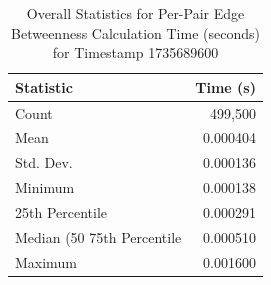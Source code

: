 \begin{table}[htbp]
\centering
\caption{Overall Statistics for Per-Pair Edge Betweenness Calculation Time (seconds) for Timestamp 1735689600}
\label{tab:betweenness_timing_stats_1735689600}
\begin{tabular}{lr}
\toprule
Statistic & Time (s) \\
\midrule
Count & 499,500 \\
Mean & 0.000404 \\
Std. Dev. & 0.000136 \\
Minimum & 0.000138 \\
25th Percentile & 0.000291 \\
Median (50%
75th Percentile & 0.000510 \\
Maximum & 0.001600 \\
\bottomrule
\end{tabular}
\end{table}
